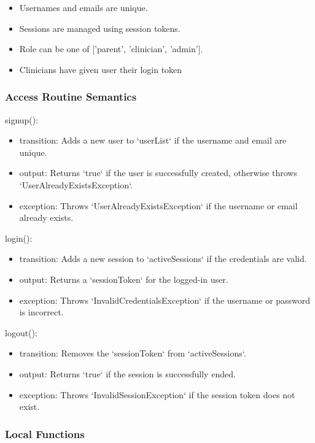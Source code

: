 \documentclass[12pt, titlepage]{article}
\begin{document}
\begin{itemize}
\item Usernames and emails are unique.
\item Sessions are managed using session tokens.
\item Role can be one of ['parent', 'clinician', 'admin'].
\item Clinicians have given user their login token
\end{itemize}

\subsubsection{Access Routine Semantics}

\noindent signup():
\begin{itemize}
\item transition: Adds a new user to `userList` if the username and email are unique.
\item output: Returns `true` if the user is successfully created, otherwise throws `UserAlreadyExistsException`.
\item exception: Throws `UserAlreadyExistsException` if the username or email already exists.
\end{itemize}

\noindent login():
\begin{itemize}
\item transition: Adds a new session to `activeSessions` if the credentials are valid.
\item output: Returns a `sessionToken` for the logged-in user.
\item exception: Throws `InvalidCredentialsException` if the username or password is incorrect.
\end{itemize}

\noindent logout():
\begin{itemize}
\item transition: Removes the `sessionToken` from `activeSessions`.
\item output: Returns `true` if the session is successfully ended.
\item exception: Throws `InvalidSessionException` if the session token does not exist.
\end{itemize}

\subsubsection{Local Functions}
\end{document}
